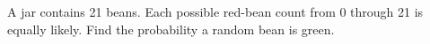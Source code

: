 A jar contains 21 beans. Each possible red-bean count from 0 through 21 is equally likely. Find the probability a random bean is green.
